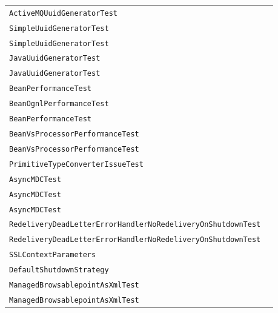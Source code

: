 \begin{center}
\begin{tabular}{ll}
\lstinline/ActiveMQUuidGeneratorTest/&\raisebox{0pt}{\lstinline/testPerformance()/}\\
\lstinline/SimpleUuidGeneratorTest/&\raisebox{0pt}{\lstinline/testPerformance()/}\\
\lstinline/SimpleUuidGeneratorTest/&\raisebox{0pt}{\lstinline/testPerformance()/}\\
\lstinline/JavaUuidGeneratorTest/&\raisebox{0pt}{\lstinline/testPerformance()/}\\
\lstinline/JavaUuidGeneratorTest/&\raisebox{0pt}{\lstinline/testPerformance()/}\\
\lstinline/BeanPerformanceTest/&\raisebox{0pt}{\lstinline/testBeanPerformance()/}\\
\lstinline/BeanOgnlPerformanceTest/&\raisebox{0pt}{\lstinline/testBeanOgnlPerformance()/}\\
\lstinline/BeanPerformanceTest/&\raisebox{0pt}{\lstinline/testBeanPerformance()/}\\
\lstinline/BeanVsProcessorPerformanceTest/&\raisebox{0pt}{\lstinline/testProcessor()/}\\
\lstinline/BeanVsProcessorPerformanceTest/&\raisebox{0pt}{\lstinline/testBean()/}\\
\lstinline/PrimitiveTypeConverterIssueTest/&\raisebox{0pt}{\lstinline/testPrimitiveTypeConverter()/}\\
\lstinline/AsyncMDCTest/&\raisebox{0pt}{\lstinline/testThreeMessagesMDC()/}\\
\lstinline/AsyncMDCTest/&\raisebox{0pt}{\lstinline/testThreeMessagesMDC()/}\\
\lstinline/AsyncMDCTest/&\raisebox{0pt}{\lstinline/testThreeMessagesMDC()/}\\
\lstinline/RedeliveryDeadLetterErrorHandlerNoRedeliveryOnShutdownTest/&\raisebox{0pt}{\lstinline/testRedeliveryErrorHandlerNoRedeliveryOnShutdown()/}\\
\lstinline/RedeliveryDeadLetterErrorHandlerNoRedeliveryOnShutdownTest/&\raisebox{0pt}{\lstinline/testRedeliveryErrorHandlerNoRedeliveryOnShutdown()/}\\
\lstinline/SSLContextParameters/&\raisebox{0pt}{\lstinline/createSSLContext(CamelContext)/}\\
\lstinline/DefaultShutdownStrategy/&\raisebox{0pt}{\lstinline/doShutdown(CamelContext,long,TimeUnit,boolean,boolean,boolean)/}\\
\lstinline/ManagedBrowsablepointAsXmlTest/&\raisebox{0pt}{\lstinline/testBrowseablepointAsXmlIncludeBody()/}\\
\lstinline/ManagedBrowsablepointAsXmlTest/&\raisebox{0pt}{\lstinline/testBrowseablepointAsXmlIncludeBody()/}\\

\end{tabular}
\end{center}
